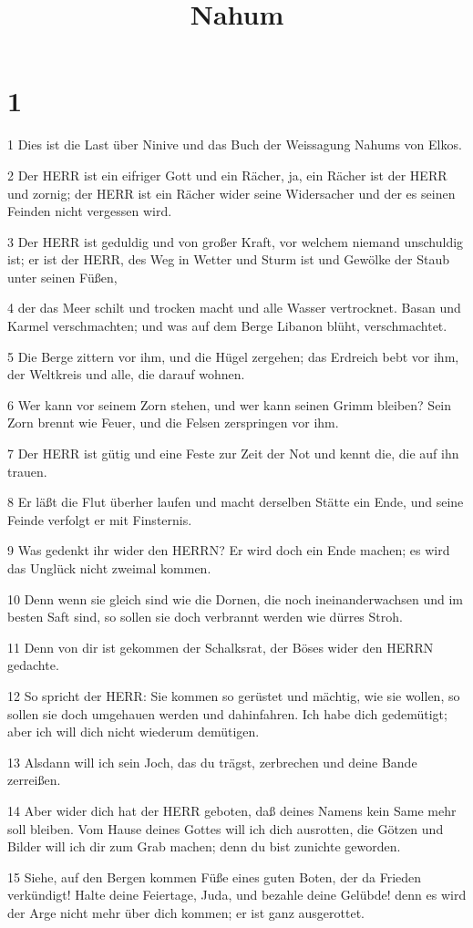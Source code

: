 

\title{Nahum}


\chapter{1}

\par 1 Dies ist die Last über Ninive und das Buch der Weissagung Nahums von Elkos.
\par 2 Der HERR ist ein eifriger Gott und ein Rächer, ja, ein Rächer ist der HERR und zornig; der HERR ist ein Rächer wider seine Widersacher und der es seinen Feinden nicht vergessen wird.
\par 3 Der HERR ist geduldig und von großer Kraft, vor welchem niemand unschuldig ist; er ist der HERR, des Weg in Wetter und Sturm ist und Gewölke der Staub unter seinen Füßen,
\par 4 der das Meer schilt und trocken macht und alle Wasser vertrocknet. Basan und Karmel verschmachten; und was auf dem Berge Libanon blüht, verschmachtet.
\par 5 Die Berge zittern vor ihm, und die Hügel zergehen; das Erdreich bebt vor ihm, der Weltkreis und alle, die darauf wohnen.
\par 6 Wer kann vor seinem Zorn stehen, und wer kann seinen Grimm bleiben? Sein Zorn brennt wie Feuer, und die Felsen zerspringen vor ihm.
\par 7 Der HERR ist gütig und eine Feste zur Zeit der Not und kennt die, die auf ihn trauen.
\par 8 Er läßt die Flut überher laufen und macht derselben Stätte ein Ende, und seine Feinde verfolgt er mit Finsternis.
\par 9 Was gedenkt ihr wider den HERRN? Er wird doch ein Ende machen; es wird das Unglück nicht zweimal kommen.
\par 10 Denn wenn sie gleich sind wie die Dornen, die noch ineinanderwachsen und im besten Saft sind, so sollen sie doch verbrannt werden wie dürres Stroh.
\par 11 Denn von dir ist gekommen der Schalksrat, der Böses wider den HERRN gedachte.
\par 12 So spricht der HERR: Sie kommen so gerüstet und mächtig, wie sie wollen, so sollen sie doch umgehauen werden und dahinfahren. Ich habe dich gedemütigt; aber ich will dich nicht wiederum demütigen.
\par 13 Alsdann will ich sein Joch, das du trägst, zerbrechen und deine Bande zerreißen.
\par 14 Aber wider dich hat der HERR geboten, daß deines Namens kein Same mehr soll bleiben. Vom Hause deines Gottes will ich dich ausrotten, die Götzen und Bilder will ich dir zum Grab machen; denn du bist zunichte geworden.
\par 15 Siehe, auf den Bergen kommen Füße eines guten Boten, der da Frieden verkündigt! Halte deine Feiertage, Juda, und bezahle deine Gelübde! denn es wird der Arge nicht mehr über dich kommen; er ist ganz ausgerottet.

